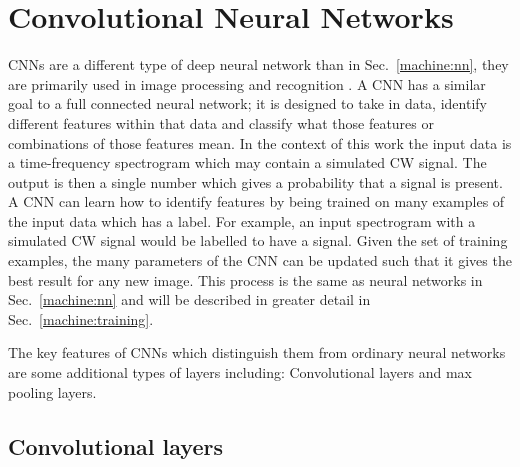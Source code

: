 \section{\label{machine:cnn}Convolutional Neural Networks}

\glspl{CNN} are a different type of deep neural network than in Sec.~\ref{machine:nn}, they are primarily used in image processing and recognition
\cite{lecun2015DeepLearning,lecun1998GradientbasedLearning,waibel1989PhonemeRecognition,krizhevsky2012ImageNetClassificationa}.
A \gls{CNN} has a similar goal to a full connected neural network; it is designed to take in data, identify different features within that data and classify what those features or combinations of those features mean.
In the context of this work the input data is a time-frequency spectrogram which may contain a simulated \gls{CW} signal.
The output is then a single number which gives a probability that a signal is present.
A \gls{CNN} can learn how to identify features by being trained on many
examples of the input data which has a label.
For example, an input spectrogram with a simulated \gls{CW} signal would be labelled to have a signal.
Given the set of training examples, the many parameters of the \gls{CNN} can
be updated such that it gives the best result for any new image. 
This process is the same as neural networks in Sec.~\ref{machine:nn} and will be described in greater detail in Sec.~\ref{machine:training}.

The key features of \glspl{CNN} which distinguish them from ordinary neural networks are some additional types of layers including: Convolutional layers and max pooling layers. 


\subsection{Convolutional layers}

